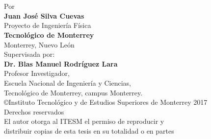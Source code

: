\begin{titlepage}
\BgThispage %
    \begin{center}
		~\\[5cm]
        \Large
        \textbf{}\\[0.8cm] %
        \large
        Por\\[0.8cm]
        \textbf{Juan José Silva Cuevas}\\ %
        Proyecto de Ingeniería Física\\[0.8cm]
		\textbf{Tecnol\'ogico de Monterrey}\\ %
        Monterrey, Nuevo Le\'on\\[0.8cm] %
        Supervisada por:\\[0.8cm]
		\textbf{Dr. Blas Manuel Rodríguez Lara }\\ %
        Profesor Investigador, \\
        Escuela Nacional de Ingenier\'ia y Ciencias,\\
        Tecnol\'ogico de Monterrey, campus Monterrey.\\[2.1cm]
        \copyright Instituto Tecnológico y de Estudios Superiores de Monterrey 2017\\ %
        Derechos reservados\\
        El autor otorga al ITESM el permiso de reproducir y\\
        distribuir copias de esta tesis en su totalidad o en partes
    \end{center}
\end{titlepage}
